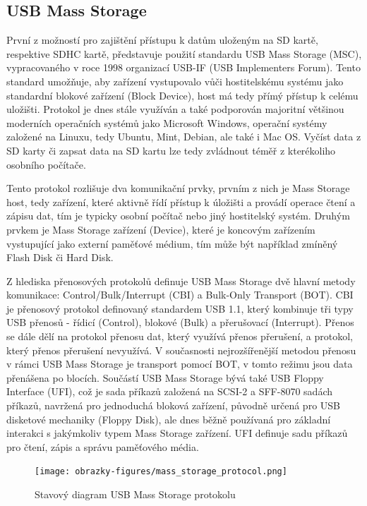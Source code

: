 \subsection{USB Mass Storage}
První z možností pro zajištění přístupu k datům uloženým na SD kartě, respektive SDHC kartě, představuje použití standardu USB Mass Storage (MSC), vypracovaného v roce 1998 organizací USB-IF (USB Implementers Forum). Tento standard umožňuje, aby zařízení vystupovalo vůči hostitelskému systému jako standardní blokové zařízení (Block Device), host má tedy přímý přístup k celému uložišti. Protokol je dnes stále využíván a také podporován majoritní většinou moderních operačních systémů jako Microsoft Windows, operační systémy založené na Linuxu, tedy Ubuntu, Mint, Debian, ale také i Mac OS. Vyčíst data z SD karty či zapsat data na SD kartu lze tedy zvládnout téměř z kterékoliho osobního počítače.

Tento protokol rozlišuje dva komunikační prvky, prvním z nich je Mass Storage host, tedy zařízení, které aktivně řídí přístup k úložišti a provádí operace čtení a zápisu dat, tím je typicky osobní počítač nebo jiný hostitelský systém. Druhým prvkem je Mass Storage zařízení (Device), které je koncovým zařízením vystupující jako externí paměťové médium, tím může být například zmíněný Flash Disk či Hard Disk.

Z hlediska přenosových protokolů definuje USB Mass Storage dvě hlavní metody komunikace: Control/Bulk/Interrupt (CBI) a Bulk-Only Transport (BOT). CBI je přenosový protokol definovaný standardem USB 1.1, který kombinuje tři typy USB přenosů - řídicí (Control), blokové (Bulk) a přerušovací (Interrupt). Přenos se dále dělí na protokol přenosu dat, který využívá přenos přerušení, a protokol, který přenos přerušení nevyužívá. V současnosti nejrozšířenější metodou přenosu v rámci USB Mass Storage je transport pomocí BOT, v tomto režimu jsou data přenášena po blocích.
Součástí USB Mass Storage bývá také USB Floppy Interface (UFI), což je sada příkazů založená na SCSI-2 a SFF-8070 sadách příkazů, navržená pro jednoduchá bloková zařízení, původně určená pro USB disketové mechaniky (Floppy Disk), ale dnes běžně používaná pro základní interakci s jakýmkoliv typem Mass Storage zařízení. UFI definuje sadu příkazů pro čtení, zápis a správu paměťového média. \cite{usb_standard_ufi}

\begin{figure}[h]
    \centering
    \texttt{[image: obrazky-figures/mass\_storage\_protocol.png]}
    
    \caption{Stavový diagram USB Mass Storage protokolu \cite{silicon_labs_mass_storage_protocol}}
    \label{fig:mass-storage-protocol}
\end{figure}

